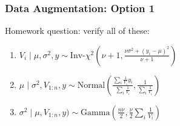 \documentclass{beamer}
\begin{document}
\begin{frame}
\frametitle{Data Augmentation: Option 1}

Homework question: verify all of these:
\begin{enumerate}
\item $V_i \mid \mu, \sigma^2, y \sim \text{Inv-}\chi^2\left(\nu + 1, \frac{ \nu \sigma^2 + (y_i - \mu)^2 }{\nu+1 } \right)$
\item $\mu \mid \sigma^2, V_{1:n}, y \sim \text{Normal}\left(\frac{\sum_i \frac{1}{V_i}y_i }{\sum_i \frac{1}{V_i} }, \frac{1}{ \sum_i \frac{1}{V_i} }\right)$ 
\item $\sigma^2 \mid \mu, V_{1:n}, y) \sim \text{Gamma}\left(\frac{n \nu}{2}, \frac{\nu}{2}\sum_i \frac{1}{V_i} \right)$
\end{enumerate}

\end{frame}
\end{document}
